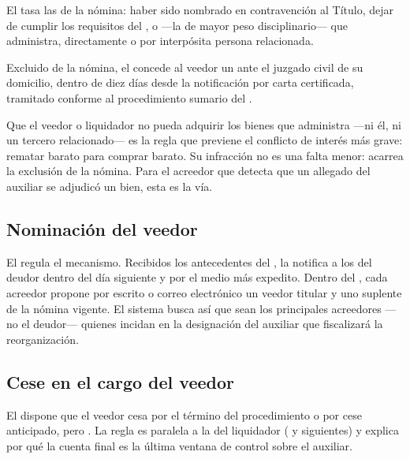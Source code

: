 El  tasa las  de la nómina: haber sido nombrado en
contravención al Título, dejar de cumplir los requisitos del , o ---la de mayor peso
disciplinario---  que administra,
directamente o por interpósita persona relacionada.

Excluido de la nómina, el  concede al veedor un  ante el juzgado civil
de su domicilio, dentro de diez días desde la notificación por carta certificada, tramitado
conforme al procedimiento sumario del .

\begin{foco}
Que el veedor o liquidador no pueda adquirir los bienes que administra ---ni él, ni un tercero
relacionado--- es la regla que previene el conflicto de interés más grave: rematar barato para
comprar barato. Su infracción no es una falta menor: acarrea la exclusión de la nómina. Para el
acreedor que detecta que un allegado del auxiliar se adjudicó un bien, esta es la vía.
\end{foco}

\subsection{Nominación del veedor}

El  regula el mecanismo. Recibidos los antecedentes del , la \superir{} notifica
a los  del deudor dentro del día siguiente y por el medio más
expedito. Dentro del , cada acreedor propone por escrito o correo
electrónico un veedor titular y uno suplente de la nómina vigente. El sistema busca así que sean
los principales acreedores ---no el deudor--- quienes incidan en la designación del auxiliar que
fiscalizará la reorganización.

\subsection{Cese en el cargo del veedor}

El  dispone que el veedor cesa por el término del procedimiento o por cese anticipado,
pero . La regla es paralela a la del liquidador ( y siguientes) y explica por
qué la cuenta final es la última ventana de control sobre el auxiliar.

